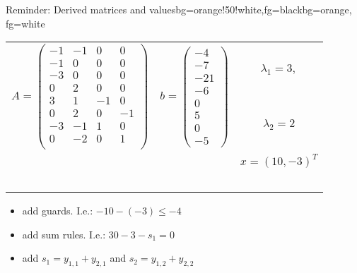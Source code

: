 \begin{frame}
	\begin{variableblock}{Reminder: Derived matrices and values}{bg=orange!50!white,fg=black}{bg=orange, fg=white}
		\begin{tabular}{llc}
			\multirow{2}{*}{$A=\begin{pmatrix}
				-1 		& -1 		&  0		& 0		 \\
				-1 		& 0 		&  0		& 0		 \\
				-3 		& 0 		&  0		& 0		 \\
				0 		& 2 		&  0		& 0		 \\
				3 		& 1 		&  -1		& 0		 \\
				0 		& 2 		&  0		& -1	 \\
				-3 		& -1 		&  1		& 0		 \\
				0 		& -2 		&  0		& 1	 	 \\
				\end{pmatrix}$}&\multirow{2}{*}{$ b=\begin{pmatrix}
				-4 \\ -7 \\ -21 \\ -6 \\ 0 \\ 5 \\ 0 \\ -5
				\end{pmatrix} $}& $\lambda_1 = 3,$ \\
			& &  $\lambda_2 = 2$\\
			& & $x=(10, -3)^T$ \\
			& & \\
			& & \\
			& & \\
			& & \\
			& & \\
		\end{tabular}
	\end{variableblock}
	\begin{example}
		\begin{itemize}
			\item add guards. I.e.: $-10-(-3)\le-4$
			\item		  add sum rules. I.e.: $30-3-s_1=0$
			\item       add $s_1= y_{1,1}+y_{2,1}$ and $s_2=y_{1,2}+y_{2,2}$
		\end{itemize}
	\end{example}	
\end{frame}

